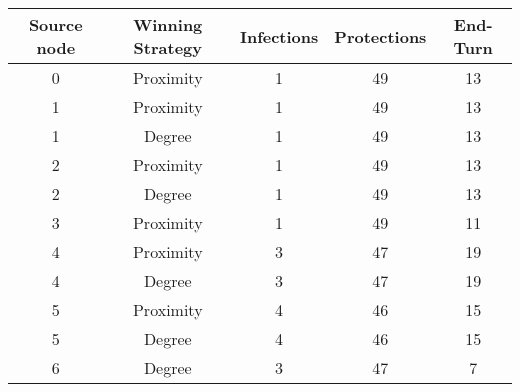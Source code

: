 \documentclass[results.tex]{subfiles}
\begin{document}
    \begin{center}
        \begin{tabular}{| c || c | c | c | c |}
            \hline
            {\bfseries Source node} & {\bfseries Winning Strategy} & {\bfseries Infections} & {\bfseries Protections}
            & {\bfseries End-Turn}
            \\  %
            \hline\hline
            0                       & Proximity                    & 1                      & 49                      & 13                   \\
            \hline
            1                       & Proximity                    & 1                      & 49                      & 13                   \\
            \hline
            1                       & Degree                       & 1                      & 49                      & 13                   \\
            \hline
            2                       & Proximity                    & 1                      & 49                      & 13                   \\
            \hline
            2                       & Degree                       & 1                      & 49                      & 13                   \\
            \hline
            3                       & Proximity                    & 1                      & 49                      & 11                   \\
            \hline
            4                       & Proximity                    & 3                      & 47                      & 19                   \\
            \hline
            4                       & Degree                       & 3                      & 47                      & 19                   \\
            \hline
            5                       & Proximity                    & 4                      & 46                      & 15                   \\
            \hline
            5                       & Degree                       & 4                      & 46                      & 15                   \\
            \hline
            6                       & Degree                       & 3                      & 47                      & 7                    \\

\end{tabular}
\end{center}
\end{document}
